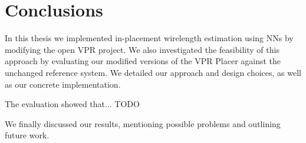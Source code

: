 
\chapter{Conclusions}\label{ch:Conclusions}
\glsresetall %

In this thesis we implemented in-placement wirelength estimation using \glspl{NN} by modifying the open \gls{VPR} project. We also investigated the feasibility of this approach by evaluating our modified versions of the \gls{VPR} Placer against the unchanged reference system. We detailed our approach and design choices, as well as our concrete implementation.

The evaluation showed that... TODO

We finally discussed our results, mentioning possible problems and outlining future work.
